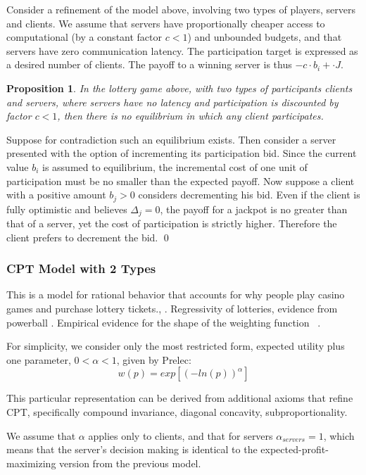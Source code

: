 \documentclass[]{article}
\newtheorem{proposition}{Proposition}
\theoremstyle{remark}
\begin{document}
Consider a refinement of the model above, involving two types of players, servers and clients. We assume that servers have proportionally cheaper access to computational (by a constant factor $c < 1$) and unbounded budgets, and that servers have zero communication latency. The participation target is expressed as a desired number of clients. The payoff to a winning server is thus $-c\cdot b_i + \cdot J$.

\begin{proposition}
In the lottery game above, with two types of participants clients and servers, where servers have no latency and participation is discounted by factor $c < 1$, then there is no equilibrium in which any client participates.
\end{proposition}
\proof
Suppose for contradiction such an equilibrium exists. Then consider a server presented with the option of incrementing its participation bid. Since the current value $b_i$ is assumed to equilibrium, the incremental cost of one unit of participation must be no smaller than the expected payoff. Now suppose a client with a positive amount $b_j > 0$ considers decrementing his bid. Even if the client is fully optimistic and believes $Δ_j = 0$, the payoff for a jackpot is no greater than that of a server, yet the cost of participation is strictly higher. Therefore the client prefers to decrement the bid.
\qed

\subsubsection{CPT Model with 2 Types}

This is a model for rational behavior that accounts for why people play casino games and purchase lottery tickets.\cite{cpt}, \cite{cptaxiomatization}. Regressivity of lotteries, evidence from powerball \cite{powerball}. Empirical evidence for the shape of the weighting function ~\cite{gonzalez1999shape}.

For simplicity, we consider only the most restricted form, expected utility plus one parameter, $0 < α < 1$, given by Prelec: ~\cite{prelec1998probability}
\begin{equation}
  w(p) = exp\left[(-ln(p))^α\right]
\end{equation}

This particular representation can be derived from additional axioms that refine CPT, specifically compound invariance, diagonal concavity, subproportionality.

We assume that $α$ applies only to clients, and that for servers $α_{servers} = 1$, which means that the server's decision making is identical to the expected-profit-maximizing version from the previous model.
\end{document}

